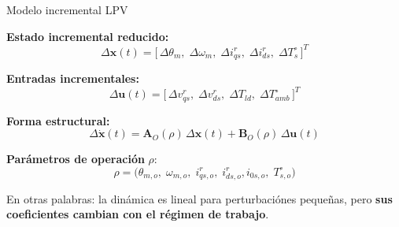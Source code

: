 \documentclass[aspectratio=169,t]{beamer}
\begin{document}
\begin{frame}{Modelo incremental LPV}
\vspace{3mm}

\textbf{Estado incremental reducido:}
\begin{equation*}
\Delta\bm{x}(t)=
\big[\,\Delta\theta_m,\;\Delta\omega_m,\;\Delta i_{qs}^{r},\;\Delta i_{ds}^{r},\;\Delta T_s^\circ\,\big]^T
\end{equation*}

\textbf{Entradas incrementales:}
\begin{equation*}
\Delta\bm{u}(t)=
\big[\,\Delta v_{qs}^{r},\;\Delta v_{ds}^{r},\;\Delta T_{ld},\;\Delta T_{amb}^\circ\,\big]^T
\end{equation*}

\textbf{Forma estructural:}
\begin{equation*}
\Delta\dot{\bm{x}}(t)=\bm{A}_O(\rho)\,\Delta\bm{x}(t)+\bm{B}_O(\rho)\,\Delta\bm{u}(t)
\end{equation*}

\textbf{Parámetros de operación} $\rho$:
\begin{equation*}
\rho=\big(\theta_{m,o},\;\omega_{m,o},\;i^r_{qs,o},\;i^r_{ds,o},i_{0s,o},\;T_{s,o}^\circ\big)
\end{equation*}

{\small En otras palabras: la dinámica es lineal para perturbaciónes pequeñas, pero \textbf{sus coeficientes cambian con el régimen de trabajo}.}
\end{frame}
\end{document}
